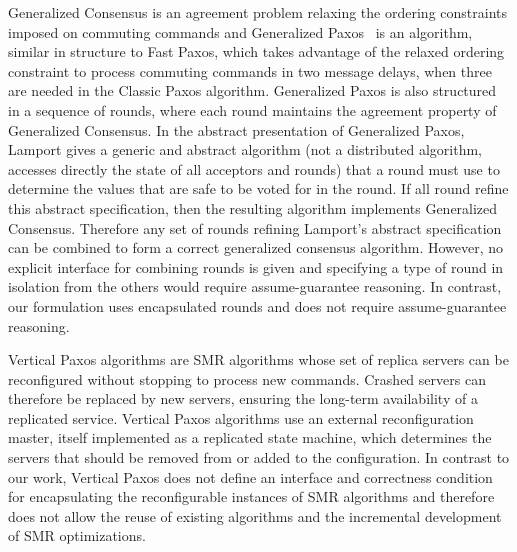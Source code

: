 Generalized Consensus is an agreement problem relaxing the ordering constraints
imposed on commuting commands and Generalized Paxos~\cite{Lamport05GeneralizeConsensus} is an algorithm, similar
in structure to Fast Paxos, which takes advantage of the relaxed ordering
constraint to process commuting commands in two message delays, when three are
needed in the Classic Paxos algorithm.
Generalized Paxos is also structured in a sequence of rounds, 
where each round maintains the agreement property of Generalized Consensus.
In the abstract presentation of Generalized Paxos, Lamport gives a generic and abstract algorithm (not a distributed algorithm, accesses directly the state of all acceptors and rounds) that a round must use to determine the values that are safe to be voted for in the round.
If all round refine this abstract specification, then the resulting algorithm implements Generalized Consensus. Therefore any set of rounds refining Lamport's abstract specification can be combined to form a correct generalized consensus algorithm.  
However, no explicit interface for combining rounds is given and specifying a type of round in isolation from the others would require assume-guarantee reasoning. In contrast, our formulation uses encapsulated rounds and does not require assume-guarantee reasoning.

Vertical Paxos algorithms are SMR algorithms whose set of replica servers can
be reconfigured without stopping to process new commands. Crashed servers can
therefore be replaced by new servers, ensuring the long-term availability of a
replicated service. Vertical Paxos algorithms use an external reconfiguration
master, itself implemented as a replicated state machine, which determines the
servers that should be removed from or added to the configuration. In contrast
to our work, Vertical Paxos does not define an interface and correctness
condition for encapsulating the reconfigurable instances of SMR algorithms and
therefore does not allow the reuse of existing algorithms and the incremental
development of SMR optimizations.


